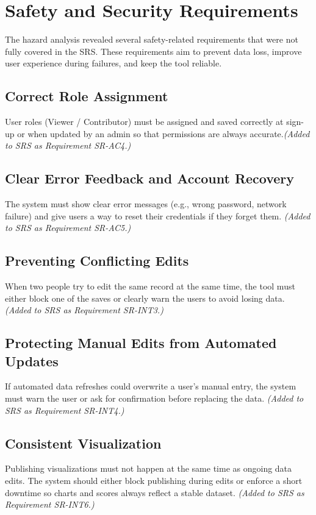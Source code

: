 \documentclass{article}
\begin{document}
\section{Safety and Security Requirements}
The hazard analysis revealed several safety-related requirements that were not fully covered in the SRS.
These requirements aim to prevent data loss, improve user experience during failures, and keep the tool reliable.
\subsection*{Correct Role Assignment}
User roles (Viewer / Contributor) must be assigned and saved correctly at sign-up or when updated by an admin so that permissions are always accurate.\textit{(Added to SRS as Requirement SR-AC4.)}

\subsection*{Clear Error Feedback and Account Recovery}
The system must show clear error messages (e.g., wrong password, network failure) and give users a way to reset their credentials if they forget them. \textit{(Added to SRS as Requirement SR-AC5.)}

\subsection*{Preventing Conflicting Edits}
When two people try to edit the same record at the same time, the tool must either block one of the saves or clearly warn the users to avoid losing data. \textit{(Added to SRS as Requirement SR-INT3.)}

\subsection*{Protecting Manual Edits from Automated Updates}
If automated data refreshes could overwrite a user’s manual entry, the system must warn the user or ask for confirmation before replacing the data. \textit{(Added to SRS as Requirement SR-INT4.)}


\subsection*{Consistent Visualization}
Publishing visualizations must not happen at the same time as ongoing data edits.
The system should either block publishing during edits or enforce a short downtime so charts and scores always reflect a stable dataset. \textit{(Added to SRS as Requirement SR-INT6.)}
\end{document}
